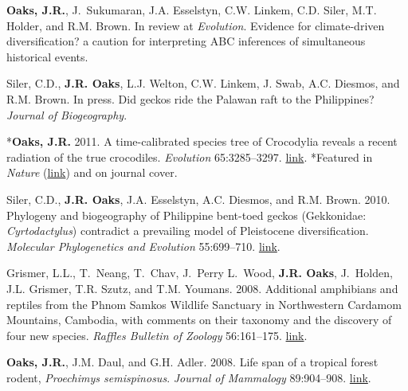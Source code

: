 \documentclass[10pt]{article}
\begin{document}
%
\begin{thebibliography}{6}
\providecommand{\natexlab}[1]{#1}
\providecommand{\url}[1]{\texttt{#1}}
\providecommand{\urlprefix}{URL }

{\bf Oaks, J.R.}, J.~Sukumaran, J.A. Esselstyn, C.W. Linkem, C.D. Siler, M.T.
  Holder, and R.M. Brown. In review at \emph{Evolution}.
\newblock Evidence for climate-driven diversification? a caution for
  interpreting {ABC} inferences of simultaneous historical events.

Siler, C.D., {\bf J.R. Oaks}, L.J. Welton, C.W. Linkem, J. Swab, A.C. Diesmos,
  and R.M. Brown. In press.
\newblock Did geckos ride the {P}alawan raft to the {P}hilippines?
\newblock \emph{Journal of Biogeography}.

*{\bf Oaks, J.R.} 2011.
\newblock A time-calibrated species tree of {C}rocodylia reveals a recent
  radiation of the true crocodiles.
\newblock \emph{Evolution} 65:3285--3297.
\newblock
  \href{http://onlinelibrary.wiley.com/doi/10.1111/j.1558-5646.2011.01373.x/abstract}{link}.
  *Featured in \emph{Nature}
  (\href{http://www.nature.com/nature/journal/v474/n7353/full/474545a.html}{link})
  and on journal cover.

Siler, C.D., {\bf J.R. Oaks}, J.A. Esselstyn, A.C. Diesmos, and R.M. Brown.
  2010.
\newblock Phylogeny and biogeography of {P}hilippine bent-toed geckos
  ({G}ekkonidae: \emph{{C}yrtodactylus}) contradict a prevailing model of
  {P}leistocene diversification.
\newblock \emph{Molecular Phylogenetics and Evolution} 55:699--710.
\newblock
  \href{http://www.sciencedirect.com/science/article/pii/S1055790310000382}{link}.

Grismer, L.L., T.~Neang, T.~Chav, J.~Perry L.~Wood, {\bf J.R. Oaks}, J.~Holden,
  J.L. Grismer, T.R. Szutz, and T.M. Youmans. 2008.
\newblock Additional amphibians and reptiles from the {P}hnom {S}amkos
  {W}ildlife {S}anctuary in {N}orthwestern {C}ardamom {M}ountains, {C}ambodia,
  with comments on their taxonomy and the discovery of four new species.
\newblock \emph{Raffles Bulletin of Zoology} 56:161--175.
\newblock
  \href{http://rmbr.nus.edu.sg/rbz/biblio/56/56rbz161-175.pdf}{link}.

{\bf Oaks, J.R.}, J.M. Daul, and G.H. Adler. 2008.
\newblock Life span of a tropical forest rodent, \emph{{P}roechimys
  semispinosus}.
\newblock \emph{Journal of Mammalogy} 89:904--908.
\newblock \href{http://dx.doi.org/10.1644/07-MAMM-A-045.1}{link}.

\end{thebibliography}
\end{document}
